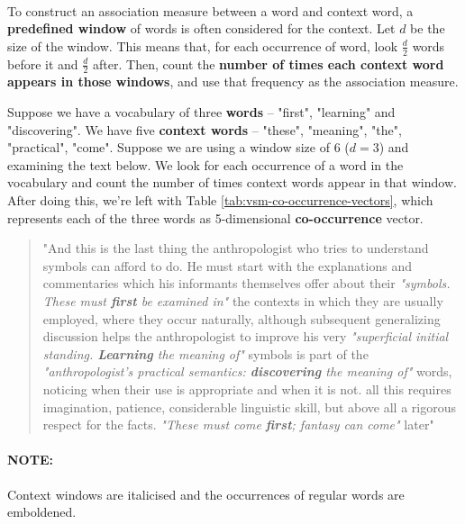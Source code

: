 \documentclass{article}
\begin{document}
\paragraph{}

To construct an association measure between a word and context word, a \textbf{predefined window} of words is often considered for the context. Let $d$ be the size of the window. This means that, for each occurrence of word, look $\frac{d}{2}$ words before it and $\frac{d}{2}$ after. Then, count the \textbf{number of times each context word appears in those windows}, and use that frequency as the association measure.

Suppose we have a vocabulary of three \textbf{words} -- "first", "learning" and "discovering". We have five \textbf{context words} -- "these", "meaning", "the", "practical", "come". Suppose we are using a window size of 6 ($d = 3$) and examining the text below. We look for each occurrence of a word in the vocabulary and count the number of times context words appear in that window. After doing this, we're left with Table \ref{tab:vsm-co-occurrence-vectors}, which represents each of the three words as 5-dimensional \textbf{co-occurrence} vector.

\begin{quote}
"And this is the last thing the anthropologist who tries to understand symbols can afford to do. He must start with the explanations and commentaries which his informants themselves offer about their \textit{"symbols. These must \textbf{first} be examined in"} the contexts in which they are usually employed, where they occur naturally, although subsequent generalizing discussion helps the anthropologist to improve his very \textit{"superficial initial standing. \textbf{Learning} the meaning of"} symbols is part of the \textit{"anthropologist's practical semantics: \textbf{discovering} the meaning of"} words, noticing when their use is appropriate and when it is not. all this requires imagination, patience, considerable linguistic skill, but above all a rigorous respect for the facts. \textit{"These must come \textbf{first}; fantasy can come"} later"
\end{quote}

\paragraph{\textbf{NOTE:}} Context windows are italicised and the occurrences of regular words are emboldened.

\paragraph{}
\end{document}
